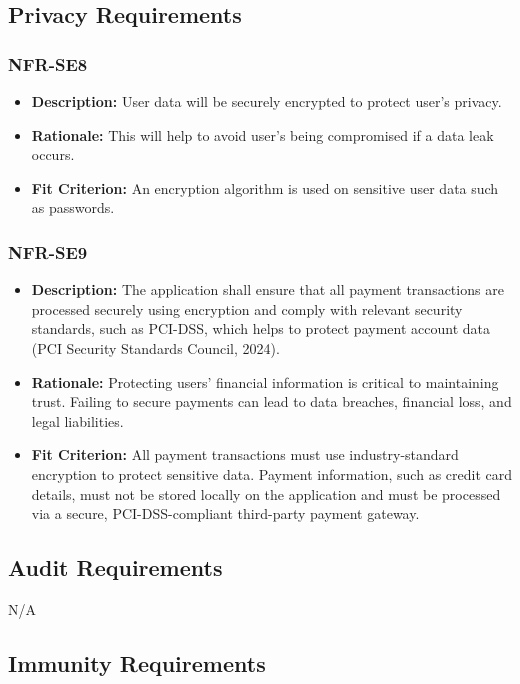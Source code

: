 \documentclass[12pt]{article}
\begin{document}
\subsection{Privacy Requirements}
\subsubsection*{NFR-SE8}
\begin{itemize}
  \item \textbf{Description:} User data will be securely encrypted to protect user’s privacy.
  \item \textbf{Rationale:} This will help to avoid user's being compromised if a data leak occurs.
  \item \textbf{Fit Criterion:} An encryption algorithm is used on sensitive user data such as passwords.
\end{itemize}
\subsubsection*{NFR-SE9}
\begin{itemize}
  \item \textbf{Description:} The application shall ensure that all payment transactions are processed securely using encryption and comply with relevant security standards, such as PCI-DSS, which helps to protect payment account data (PCI Security Standards Council, 2024).
  \item \textbf{Rationale:} Protecting users' financial information is critical to maintaining trust. Failing to secure payments can lead to data breaches, financial loss, and legal liabilities.
  \item \textbf{Fit Criterion:} All payment transactions must use industry-standard encryption to protect sensitive data. Payment information, such as credit card details, must not be stored locally on the application and must be processed via a secure, PCI-DSS-compliant third-party payment gateway.
\end{itemize}

\subsection{Audit Requirements}
N/A
\subsection{Immunity Requirements}
\end{document}
